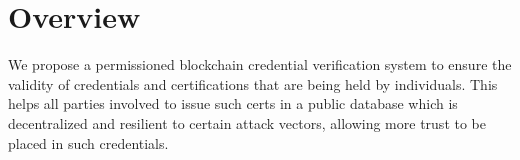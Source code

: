 \section{Overview}

We propose a permissioned blockchain credential verification system to ensure the validity of
credentials and certifications that are being held by individuals. This helps all parties involved
to issue such certs in a public database which is decentralized and resilient to certain attack
vectors, allowing more trust to be placed in such credentials.


